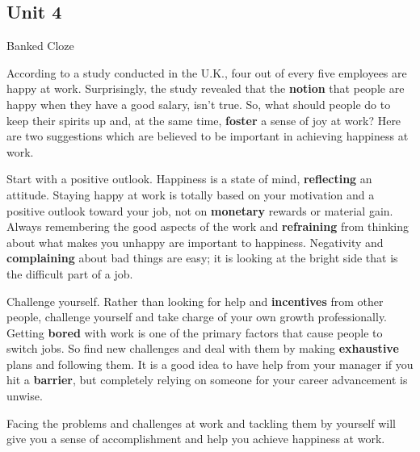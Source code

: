 \newpage

\subsection{Unit 4}

\begin{question}{Banked Cloze}

According to a study conducted in the U.K., four out of every five employees are happy at work. Surprisingly, the study revealed that the \textbf{\color{red} notion} that people are happy when they have a good salary, isn't true. So, what should people do to keep their spirits up and, at the same time, \textbf{\color{red} foster} a sense of joy at work? Here are two suggestions which are believed to be important in achieving happiness at work.

\vspace{1em}

Start with a positive outlook. Happiness is a state of mind, \textbf{\color{red} reflecting} an attitude. Staying happy at work is totally based on your motivation and a positive outlook toward your job, not on \textbf{\color{red} monetary} rewards or material gain. Always remembering the good aspects of the work and \textbf{\color{red} refraining} from thinking about what makes you unhappy are important to happiness. Negativity and \textbf{\color{red} complaining} about bad things are easy; it is looking at the bright side that is the difficult part of a job.

\vspace{1em}

Challenge yourself. Rather than looking for help and \textbf{\color{red} incentives} from other people, challenge yourself and take charge of your own growth professionally. Getting \textbf{\color{red} bored} with work is one of the primary factors that cause people to switch jobs. So find new challenges and deal with them by making \textbf{\color{red} exhaustive} plans and following them. It is a good idea to have help from your manager if you hit a \textbf{\color{red} barrier}, but completely relying on someone for your career advancement is unwise.

\vspace{1em}

Facing the problems and challenges at work and tackling them by yourself will give you a sense of accomplishment and help you achieve happiness at work.

\end{question}

